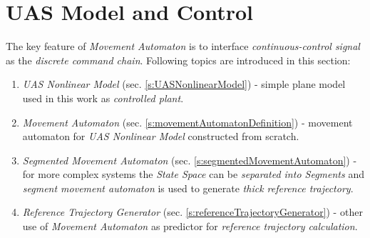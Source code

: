 \cleardoublepage
\section{UAS Model and Control}\label{s:modelMAImplementation}

\noindent The key feature of \emph{Movement Automaton} is to interface \emph{continuous-control signal} as the \emph{discrete command chain}. Following topics are introduced in this section:

\begin{enumerate}
    \item \emph{UAS Nonlinear Model} (sec. \ref{s:UASNonlinearModel}) - simple plane model used in this work as \emph{controlled plant}.
    
    \item \emph{Movement Automaton} (sec. \ref{s:movementAutomatonDefinition}) - movement automaton for \emph{UAS Nonlinear Model} constructed from scratch.
    
    \item \emph{Segmented Movement Automaton} (sec. \ref{s:segmentedMovementAutomaton}) - for more complex systems the \emph{State Space} can be \emph{separated into Segments} and \emph{segment movement automaton} is used to generate \emph{thick reference trajectory}.
    
    \item \emph{Reference Trajectory Generator} (sec. \ref{s:referenceTrajectoryGenerator}) - other use of \emph{Movement Automaton} as predictor for \emph{reference trajectory calculation}.
\end{enumerate}




